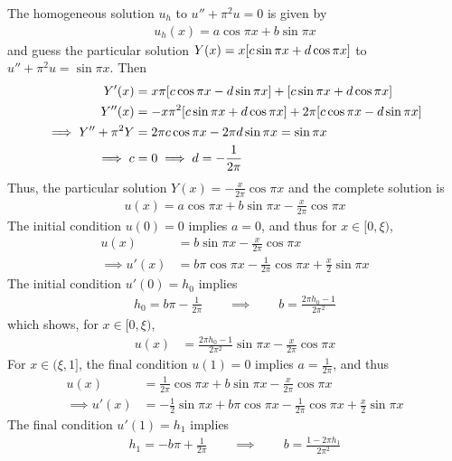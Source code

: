 \documentclass{article} %
\theoremstyle{plain}
\begin{document}
The homogeneous solution $u_h$ to $u'' + \pi^2 u = 0$ is given by
\begin{align*}
    u_h(x) = a\cos\pi x + b\sin\pi x
\end{align*}
and guess the particular solution $Y(x) = x\qty[c\sin\pi x + d\cos\pi x]$ to $u'' + \pi^2 u = \sin\pi x$.  Then
\begin{align*}
    Y'(x) &= x\pi\qty[c\cos\pi x - d\sin\pi x] + \qty[c\sin\pi x + d\cos\pi x] \\
    Y''(x) &= -x\pi^2\qty[c\sin\pi x + d\cos\pi x] + 2\pi\qty[c\cos\pi x - d\sin\pi x] \\
    \implies Y'' + \pi^2 Y &= 2\pi c\cos \pi x - 2\pi d\sin \pi x = \sin \pi x \\
    \implies c &= 0 \implies d = -\frac{1}{2\pi}
\end{align*}
Thus, the particular solution $Y(x) = -\frac{x}{2\pi}\cos\pi x$ and the complete solution is
\begin{align*}
    u(x) = a\cos\pi x + b\sin \pi x - \frac{x}{2\pi}\cos\pi x
\end{align*}
The initial condition $u(0) = 0$ implies $a = 0$, and thus for $x \in [0,\xi)$,
\begin{align*}
    u(x) &= b\sin \pi x - \frac{x}{2\pi}\cos\pi x \\
    \implies u'(x) &= b\pi\cos \pi x - \frac{1}{2\pi}\cos\pi x + \frac{x}{2}\sin\pi x
\end{align*}
The initial condition $u'(0) = h_0$ implies
\begin{align*}
    h_0 = b\pi - \frac{1}{2\pi} \qquad \implies \qquad b = \frac{2\pi h_0 - 1}{2\pi^2}
\end{align*}
which shows, for $x \in [0,\xi)$,
\begin{align*}
    u(x) &= \frac{2\pi h_0 - 1}{2\pi^2}\sin \pi x - \frac{x}{2\pi}\cos\pi x
\end{align*}
For $x \in (\xi,1]$, the final condition $u(1) = 0$ implies $a = \frac{1}{2\pi}$, and thus
\begin{align*}
    u(x) &= \frac{1}{2\pi}\cos \pi x + b\sin \pi x - \frac{x}{2\pi}\cos\pi x \\
    \implies u'(x) &= -\frac{1}{2}\sin\pi x + b\pi\cos \pi x - \frac{1}{2\pi}\cos\pi x + \frac{x}{2}\sin\pi x
\end{align*}
The final condition $u'(1) = h_1$ implies
\begin{align*}
    h_1 = -b\pi + \frac{1}{2\pi} \qquad \implies \qquad b = \frac{1 - 2\pi h_1}{2\pi^2}
\end{align*}
\end{document}
